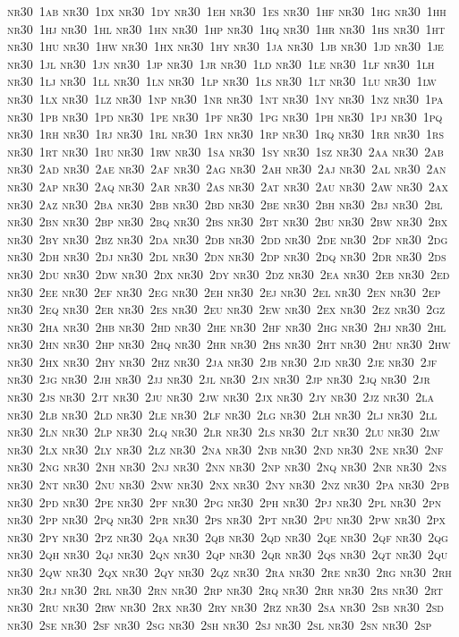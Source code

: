 \documentclass[12pt,a4paper]{article}
\begin{document}
\textsc{\lowercase{%
NR30~1AB	NR30~1DX	NR30~1DY	NR30~1EH	NR30~1ES	NR30~1HF
NR30~1HG	NR30~1HH	NR30~1HJ	NR30~1HL	NR30~1HN	NR30~1HP
NR30~1HQ	NR30~1HR	NR30~1HS	NR30~1HT	NR30~1HU	NR30~1HW
NR30~1HX	NR30~1HY	NR30~1JA	NR30~1JB	NR30~1JD	NR30~1JE
NR30~1JL	NR30~1JN	NR30~1JP	NR30~1JR	NR30~1LD	NR30~1LE
NR30~1LF	NR30~1LH	NR30~1LJ	NR30~1LL	NR30~1LN	NR30~1LP
NR30~1LS	NR30~1LT	NR30~1LU	NR30~1LW	NR30~1LX	NR30~1LZ
NR30~1NP	NR30~1NR	NR30~1NT	NR30~1NY	NR30~1NZ	NR30~1PA
NR30~1PB	NR30~1PD	NR30~1PE	NR30~1PF	NR30~1PG	NR30~1PH
NR30~1PJ	NR30~1PQ	NR30~1RH	NR30~1RJ	NR30~1RL	NR30~1RN
NR30~1RP	NR30~1RQ	NR30~1RR	NR30~1RS	NR30~1RT	NR30~1RU
NR30~1RW	NR30~1SA	NR30~1SY	NR30~1SZ	NR30~2AA	NR30~2AB
NR30~2AD	NR30~2AE	NR30~2AF	NR30~2AG	NR30~2AH	NR30~2AJ
NR30~2AL	NR30~2AN	NR30~2AP	NR30~2AQ	NR30~2AR	NR30~2AS
NR30~2AT	NR30~2AU	NR30~2AW	NR30~2AX	NR30~2AZ	NR30~2BA
NR30~2BB	NR30~2BD	NR30~2BE	NR30~2BH	NR30~2BJ	NR30~2BL
NR30~2BN	NR30~2BP	NR30~2BQ	NR30~2BS	NR30~2BT	NR30~2BU
NR30~2BW	NR30~2BX	NR30~2BY	NR30~2BZ	NR30~2DA	NR30~2DB
NR30~2DD	NR30~2DE	NR30~2DF	NR30~2DG	NR30~2DH	NR30~2DJ
NR30~2DL	NR30~2DN	NR30~2DP	NR30~2DQ	NR30~2DR	NR30~2DS
NR30~2DU	NR30~2DW	NR30~2DX	NR30~2DY	NR30~2DZ	NR30~2EA
NR30~2EB	NR30~2ED	NR30~2EE	NR30~2EF	NR30~2EG	NR30~2EH
NR30~2EJ	NR30~2EL	NR30~2EN	NR30~2EP	NR30~2EQ	NR30~2ER
NR30~2ES	NR30~2EU	NR30~2EW	NR30~2EX	NR30~2EZ	NR30~2GZ
NR30~2HA	NR30~2HB	NR30~2HD	NR30~2HE	NR30~2HF	NR30~2HG
NR30~2HJ	NR30~2HL	NR30~2HN	NR30~2HP	NR30~2HQ	NR30~2HR
NR30~2HS	NR30~2HT	NR30~2HU	NR30~2HW	NR30~2HX	NR30~2HY
NR30~2HZ	NR30~2JA	NR30~2JB	NR30~2JD	NR30~2JE	NR30~2JF
NR30~2JG	NR30~2JH	NR30~2JJ	NR30~2JL	NR30~2JN	NR30~2JP
NR30~2JQ	NR30~2JR	NR30~2JS	NR30~2JT	NR30~2JU	NR30~2JW
NR30~2JX	NR30~2JY	NR30~2JZ	NR30~2LA	NR30~2LB	NR30~2LD
NR30~2LE	NR30~2LF	NR30~2LG	NR30~2LH	NR30~2LJ	NR30~2LL
NR30~2LN	NR30~2LP	NR30~2LQ	NR30~2LR	NR30~2LS	NR30~2LT
NR30~2LU	NR30~2LW	NR30~2LX	NR30~2LY	NR30~2LZ	NR30~2NA
NR30~2NB	NR30~2ND	NR30~2NE	NR30~2NF	NR30~2NG	NR30~2NH
NR30~2NJ	NR30~2NN	NR30~2NP	NR30~2NQ	NR30~2NR	NR30~2NS
NR30~2NT	NR30~2NU	NR30~2NW	NR30~2NX	NR30~2NY	NR30~2NZ
NR30~2PA	NR30~2PB	NR30~2PD	NR30~2PE	NR30~2PF	NR30~2PG
NR30~2PH	NR30~2PJ	NR30~2PL	NR30~2PN	NR30~2PP	NR30~2PQ
NR30~2PR	NR30~2PS	NR30~2PT	NR30~2PU	NR30~2PW	NR30~2PX
NR30~2PY	NR30~2PZ	NR30~2QA	NR30~2QB	NR30~2QD	NR30~2QE
NR30~2QF	NR30~2QG	NR30~2QH	NR30~2QJ	NR30~2QN	NR30~2QP
NR30~2QR	NR30~2QS	NR30~2QT	NR30~2QU	NR30~2QW	NR30~2QX
NR30~2QY	NR30~2QZ	NR30~2RA	NR30~2RE	NR30~2RG	NR30~2RH
NR30~2RJ	NR30~2RL	NR30~2RN	NR30~2RP	NR30~2RQ	NR30~2RR
NR30~2RS	NR30~2RT	NR30~2RU	NR30~2RW	NR30~2RX	NR30~2RY
NR30~2RZ	NR30~2SA	NR30~2SB	NR30~2SD	NR30~2SE	NR30~2SF
NR30~2SG	NR30~2SH	NR30~2SJ	NR30~2SL	NR30~2SN	NR30~2SP
}}
\end{document}
